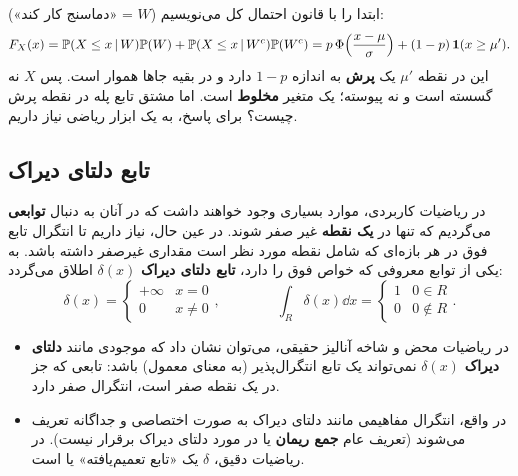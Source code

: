 \begin{center}
\end{center}

ابتدا  را با قانون احتمال کل می‌نویسیم ($W$ = «دماسنج کار کند»):
\[
F_X(x)=\mathbb{P}(X\le x\,|\, W)\mathbb{P}(W)+\mathbb{P}(X\le x\,|\, W^c)\mathbb{P}(W^c)
=p\,\Phi\Big(\frac{x-\mu}{\sigma}\Big)+(1-p)\,\mathbf{1}(x\ge\mu').
\]
این  در نقطه $\mu'$ یک \textbf{پرش} به اندازه $1-p$ دارد و در بقیه جاها هموار است. پس $X$ نه گسسته است و نه پیوسته؛ یک متغیر \textbf{مخلوط} است. اما مشتق تابع پله در نقطه پرش چیست؟ برای پاسخ، به یک ابزار ریاضی نیاز داریم.

\subsection{تابع دلتای دیراک}
در ریاضیات کاربردی، موارد بسیاری وجود خواهند داشت که در آنان به دنبال \textbf{توابعی} می‌گردیم که تنها در \textbf{یک نقطه} غیر صفر شوند. در عین حال، نیاز داریم تا انتگرال تابع فوق در هر بازه‌ای که شامل نقطه مورد نظر است مقداری غیرصفر داشته باشد. به یکی از توابع معروفی که خواص فوق را دارد، \textbf{تابع دلتای دیراک} $\delta(x)$ اطلاق می‌گردد:
\[
\delta(x)=\begin{cases}+\infty & x=0\\ 0 & x\neq0\end{cases},
\qquad\qquad
\int_R\delta(x)\dd x=\begin{cases}1 & 0\in R\\ 0 & 0\notin R\end{cases}.
\]

\begin{itemize}
\item در ریاضیات محض و شاخه آنالیز حقیقی، می‌توان نشان داد که موجودی مانند \textbf{دلتای دیراک} $\delta(x)$ نمی‌تواند یک تابع انتگرال‌پذیر (به معنای معمول) باشد: تابعی که جز در یک نقطه صفر است، انتگرال صفر دارد.
\item در واقع، انتگرال مفاهیمی مانند دلتای دیراک به صورت اختصاصی و جداگانه تعریف می‌شوند (تعریف عام \textbf{جمع ریمان} یا  در مورد دلتای دیراک برقرار نیست). در ریاضیات دقیق، $\delta$ یک «تابع تعمیم‌یافته» یا  است.
\end{itemize}

